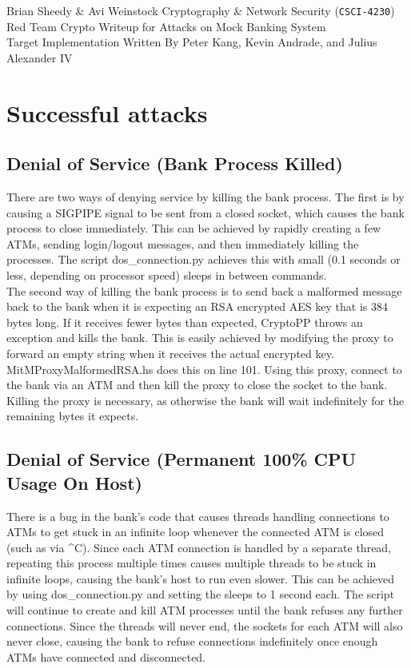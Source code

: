 \documentclass[12pt]{article}
\begin{document}
\noindent
Brian Sheedy \& Avi Weinstock \hfill Cryptography \& Network Security (\Verb|CSCI-4230|)\\
Red Team Crypto Writeup for Attacks on Mock Banking System\\
Target Implementation Written By Peter Kang, Kevin Andrade, and Julius Alexander IV
\doublespace

\section*{Successful attacks}
\subsection*{Denial of Service (Bank Process Killed)}
There are two ways of denying service by killing the bank process. The first is by causing a SIGPIPE signal to be sent from a closed socket, which causes the bank process to close immediately. This can be achieved by rapidly creating a few ATMs, sending login/logout messages, and then immediately killing the processes. The script dos\_connection.py achieves this with small (0.1 seconds or less, depending on processor speed) sleeps in between commands.\\
The second way of killing the bank process is to send back a malformed message back to the bank when it is expecting an RSA encrypted AES key that is 384 bytes long. If it receives fewer bytes than expected, CryptoPP throws an exception and kills the bank. This is easily achieved by modifying the proxy to forward an empty string when it receives the actual encrypted key. MitMProxyMalformedRSA.hs does this on line 101. Using this proxy, connect to the bank via an ATM and then kill the proxy to close the socket to the bank. Killing the proxy is necessary, as otherwise the bank will wait indefinitely for the remaining bytes it expects.
\subsection*{Denial of Service (Permanent 100\% CPU Usage On Host)}
There is a bug in the bank’s code that causes threads handling connections to ATMs to get stuck in an infinite loop whenever the connected ATM is closed (such as via \^{}C). Since each ATM connection is handled by a separate thread, repeating this process multiple times causes multiple threads to be stuck in infinite loops, causing the bank's host to run even slower. This can be achieved by using dos\_connection.py and setting the sleeps to 1 second each. The script will continue to create and kill ATM processes until the bank refuses any further connections. Since the threads will never end, the sockets for each ATM will also never close, causing the bank to refuse connections indefinitely once enough ATMs have connected and disconnected.
\end{document}
